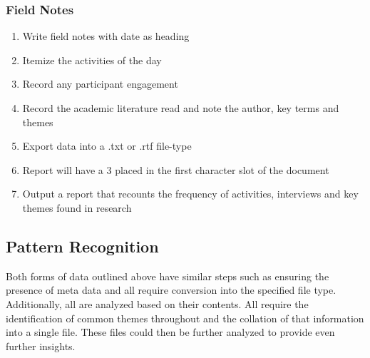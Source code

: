 \documentclass{article}
\begin{document}
\subsubsection{Field Notes}
\begin{enumerate}
    \item Write field notes with date as heading
    \item Itemize the activities of the day
    \item Record any participant engagement
    \item Record the academic literature read and note the author, key terms and themes
    \item Export data into a .txt or .rtf file-type
    \item Report will have a 3 placed in the first character slot of the document
    \item Output a report that recounts the frequency of activities, interviews and key themes found in research
\end{enumerate}
\subsection{Pattern Recognition}
Both forms of data outlined above have similar steps such as ensuring the presence of meta data and all require conversion into the specified file type. Additionally, all are analyzed based on their contents. All require the identification of common themes throughout and the collation of that information into a single file. These files could then be further analyzed to provide even further insights.
\end{document}
